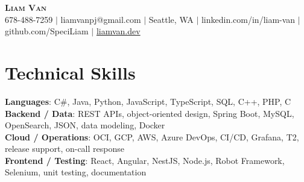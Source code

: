 \documentclass[letterpaper,11pt]{article}
\begin{document}

%
\begin{center}
    \textbf{\Huge \scshape Liam Van} \\ \vspace{1pt}
    \small 678-488-7259 $|$ \small {liamvanpj@gmail.com} $|$ Seattle, WA
 {{$|$ linkedin.com/in/liam-van} {$|$ github.com/SpeciLiam} {$|$ \href{https://liamvan.dev}{liamvan.dev}}}

\end{center}

\section{Technical Skills}
 \begin{itemize}[leftmargin=0.15in, label={}]
    \small{\item{
     \textbf{Languages}{: C\#, Java, Python, JavaScript, TypeScript, SQL, C++, PHP, C} \\
     \textbf{Backend / Data}{: REST APIs, object-oriented design, Spring Boot, MySQL, OpenSearch, JSON, data modeling, Docker} \\
     \textbf{Cloud / Operations}{: OCI, GCP, AWS, Azure DevOps, CI/CD, Grafana, T2, release support, on-call response} \\
     \textbf{Frontend / Testing}{: React, Angular, NestJS, Node.js, Robot Framework, Selenium, unit testing, documentation} \\
    }}
 \end{itemize}
%

\end{document}
